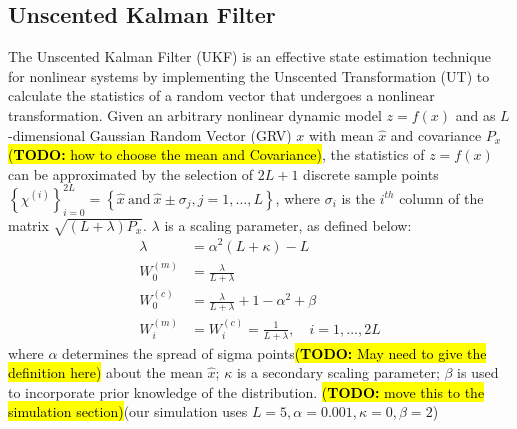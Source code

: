 \documentclass[letterpaper, 10 pt, conference]{ieeeconf}
\newcommand{\todohere}[1]{\hl{(\textbf{TODO:} #1)}}
\begin{document}
	\subsection{Unscented Kalman Filter}\label{subsec:UKF}
	The Unscented Kalman Filter (UKF) is an effective state estimation technique for nonlinear systems by implementing the Unscented Transformation (UT) to calculate the statistics of a random vector that undergoes a nonlinear transformation\cite {KalmanFiltering}.
	Given an arbitrary nonlinear dynamic model $z=f(x)$ and as $L$-dimensional Gaussian Random Vector (GRV) $x$ with mean $\hat{x}$ and covariance $P_x$\todohere{how to choose the mean and Covariance}, the statistics of $z=f(x)$ can be approximated by the selection of $2L+1$ discrete sample points $\left\{\chi^{(i)} \right\}_{i=0}^{2L}=\left\{ \hat{x}\ \text{and}\  \hat{x} \pm \sigma_j, j=1,...,L\right \}$, where $\sigma_i$ is the $i^{th}$ column of the matrix $\sqrt{(L+\lambda)P_x}$. $\lambda$ is a scaling parameter, as defined below:
	\begin{subequations}
		\begin{align}
		\lambda&=\alpha^2(L+\kappa)-L\\
		W_0^{(m)}&=\frac{\lambda}{L+\lambda}\\
		W_0^{(c)}&=\frac{\lambda}{L+\lambda}+1-\alpha^2+\beta\\
		W_i^{(m)}&=W_i^{(c)}=\frac{1}{L+\lambda},\quad i=1,...,2L 
		\end{align}
	\end{subequations}
	where $\alpha$ determines the spread of sigma points\todohere{May need to give the definition here} about the mean $\hat{x}$; $\kappa$ is a secondary scaling parameter; $\beta$ is used to incorporate prior knowledge of the distribution. \todohere{move this to the simulation section}(our simulation uses $L=5,\alpha=0.001, \kappa=0, \beta=2$)  
	
\end{document}
